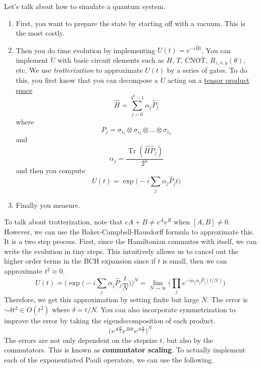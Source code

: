 \documentclass{article}
\DeclareMathOperator{\Tr}{Tr}
\begin{document}
  Let's talk about how to simulate a quantum system. 
  \begin{enumerate}
    \item First, you want to prepare the state by starting off with a vacuum. This is the most costly. 
    \item Then you do time evolution by implementing $U (t) = e^{-i \hat{H} t}$. You can implement $U$ with basic circuit elements such as $H$, $T$, $\mathrm{CNOT}$, $R_{z, x, y} (\theta)$, etc. We use \textit{trotterization} to approximate $U(t)$ by a series of gates. To do this, you first know that you can decompose a $U$ acting on a \hyperref[lin-def:tensor]{tensor product space} 
      \begin{equation}
        \hat{H} = \sum_{j=0}^{4^n - 1} \alpha_j \hat{P}_j 
      \end{equation}
      where 
      \begin{equation}
        P_j = \sigma_{i_1} \otimes \sigma_{i_2} \otimes \ldots \otimes \sigma_{i_n}
      \end{equation}
      and 
      \begin{equation}
        \alpha_j = \frac{\Tr(\hat{H} \hat{P}_j)}{2^n}
      \end{equation}
      and then you compute 
      \begin{equation}
        U(t) = \exp \bigg( -i \sum_j \alpha_j \hat{P}_j t \bigg)
      \end{equation}
    \item Finally you measure. 
  \end{enumerate}

  To talk about trotterization, note that $e{A + B} \neq e^A e^B$ when $[A, B] \neq 0$. However, we can use the Baker-Campbell-Hausdorff formula to approximate this. It is a two step process. First, since the Hamiltonian commutes with itself, we can write the evolution in tiny steps. This intuitively allows us to cancel out the higher order terms in the BCH expansion since if $t$ is small, then we can approximate $t^2 \approx 0$.  
  \begin{equation} 
    U(t) = \bigg( \exp \bigg( -i \sum_j \alpha_j \hat{P}_j \frac{t}{N} \bigg)\bigg)^N = \lim_{N \rightarrow \infty} \bigg( \prod_j e^{-i \alpha_j \alpha_j \hat{P}_j (t /N)} \bigg)
  \end{equation}
  Therefore, we get this approximation by setting finite but large $N$. The error is $\sim \delta t^2 \in O(t^2)$ where $\delta = t / N$. You can also incorporate symmetrization to improve the error by taking the eigendecomposition of each product. 
  \begin{equation}
    \big( e^{A \frac{\delta t}{2}} e^{B \delta t} e^{A \frac{\delta t}{2} }\big)^N
  \end{equation}
  The errors are not only dependent on the stepsize $t$, but also by the commutators. This is known as \textbf{commutator scaling}. To actually implement each of the exponentiated Pauli operators, we can use the following. 
\end{document}
